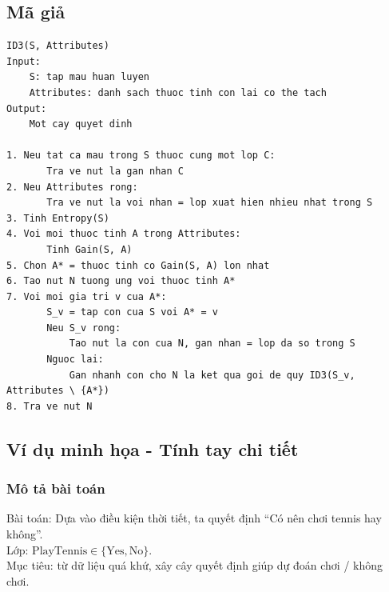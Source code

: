 \subsection{Mã giả}
\begin{lstlisting}[caption={Mã giả thuật toán ID3}]
ID3(S, Attributes)
Input:
    S: tap mau huan luyen
    Attributes: danh sach thuoc tinh con lai co the tach
Output:
    Mot cay quyet dinh

1. Neu tat ca mau trong S thuoc cung mot lop C:
       Tra ve nut la gan nhan C
2. Neu Attributes rong:
       Tra ve nut la voi nhan = lop xuat hien nhieu nhat trong S
3. Tinh Entropy(S)
4. Voi moi thuoc tinh A trong Attributes:
       Tinh Gain(S, A)
5. Chon A* = thuoc tinh co Gain(S, A) lon nhat
6. Tao nut N tuong ung voi thuoc tinh A*
7. Voi moi gia tri v cua A*:
       S_v = tap con cua S voi A* = v
       Neu S_v rong:
           Tao nut la con cua N, gan nhan = lop da so trong S
       Nguoc lai:
           Gan nhanh con cho N la ket qua goi de quy ID3(S_v, Attributes \ {A*})
8. Tra ve nut N
\end{lstlisting}

\subsection{Ví dụ minh họa - Tính tay chi tiết}

\subsubsection*{Mô tả bài toán}
Bài toán: Dựa vào điều kiện thời tiết, ta quyết định ``Có nên chơi tennis hay không''. \\
Lớp: $\text{PlayTennis} \in \{\text{Yes}, \text{No}\}$. \\
Mục tiêu: từ dữ liệu quá khứ, xây cây quyết định giúp dự đoán chơi / không chơi.

